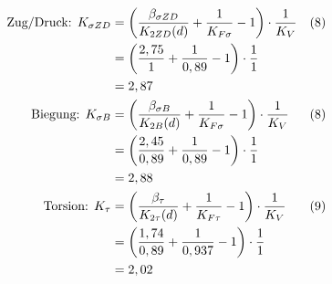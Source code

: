 \begin{itemize}
	\begin{align*}
		\text{Zug/Druck: } K_{\sigma ZD} &= \left( \frac{\beta_{\sigma ZD}}{K_{2ZD} (d)} + \frac{1}{K_{F\sigma}} -1\right) \cdot \frac{1}{K_V} & (8) \\
		&= \left( \frac{2,75}{1} + \frac{1}{0,89} -1\right) \cdot \frac{1}{1} \\
		&= 2,87 \\
		\text{Biegung: } K_{\sigma B} &= \left( \frac{\beta_{\sigma B}}{K_{2B}(d)} + \frac{1}{K_{F\sigma}} -1\right) \cdot \frac{1}{K_V} & (8) \\
		&= \left( \frac{2,45}{0,89} + \frac{1}{0,89} -1\right) \cdot \frac{1}{1} \\
		&= 2,88 \\
		\text{Torsion: } K_{\tau} &= \left( \frac{\beta_{\tau}}{K_{2\tau}(d)} + \frac{1}{K_{F\tau}} -1\right) \cdot \frac{1}{K_V} & (9) \\
		&= \left( \frac{1,74}{0,89} + \frac{1}{0,937} -1\right) \cdot \frac{1}{1} \\
		&= 2,02 
	\end{align*}
\end{itemize}
